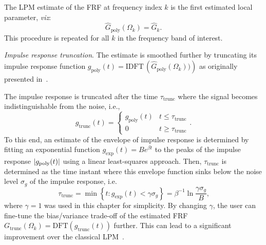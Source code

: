 \begin{enumerate}
  The \gls{LPM} estimate of the \gls{FRF} at frequency index $k$ is the first estimated local parameter, \emph{viz}:
\begin{equation}
\hat{G}_\text{poly}(\Omega_k) = \hat{G}_k
\text{.}
\end{equation}
This procedure is repeated for all $k$ in the frequency band of interest.


\emph{Impulse response truncation}. 
The estimate is smoothed further by truncating its impulse response function $g_{\text{poly}}(t) = \mathrm{IDFT}\, \left( \hat{G}_\text{poly}(\Omega_k)) \right)$ as originally presented in~\citep{Lumori2014TIM}.

The impulse response is truncated after the time $\tau_{\mathrm{trunc}}$ where the signal becomes indistinguishable from the noise, i.e.,
\begin{equation}
  g_{\mathrm{trunc}}(t) = 
  \begin{cases}
    g_{\text{poly}}(t) & t \leq \tau_{\mathrm{trunc}} \\
    0                    & t \geq \tau_{\mathrm{trunc}}
  \end{cases}
  \text{.}
\end{equation}
To this end, an estimate of the envelope of impulse response is determined by fitting an exponential function $g_{\mathrm{exp}}(t) = B e^{\beta t}$ to the peaks of the impulse response $\left| g_{\mathrm{poly}}(t) \right|$ using a linear least-squares approach.
Then, $\tau_{\mathrm{trunc}}$ is determined as the time instant where this envelope function sinks below the noise level $\sigma_g$ of the impulse response, i.e. 
\begin{equation}
  \tau_{\mathrm{trunc}} = \min \left\{  t :  g_{\mathrm{exp}}(t) < \gamma \sigma_g \right\}
  = \beta^{-1} \ln \frac{\gamma \sigma_g}{B}
  \text{,}
\end{equation}
where $\gamma=1$ was used in this chapter for simplicity.
By changing $\gamma$, the user can fine-tune the bias/variance trade-off of the estimated FRF $G_{\mathrm{trunc}}(\Omega_k) = \mathrm{DFT} \left( g_{\mathrm{trunc}}(t)\right)$ further.
This can lead to a significant improvement over the classical LPM~\citep{Lumori2014TIM}.
 

\end{enumerate}
